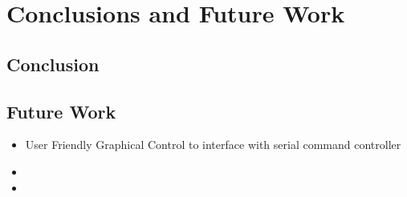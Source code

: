 \chapter{Conclusions and Future Work}\label{C:conclusion}

\section{Conclusion}

\section{Future Work}
\begin{itemize}
    \item User Friendly Graphical Control to interface with serial command controller
    \item 
    \item 
\end{itemize}